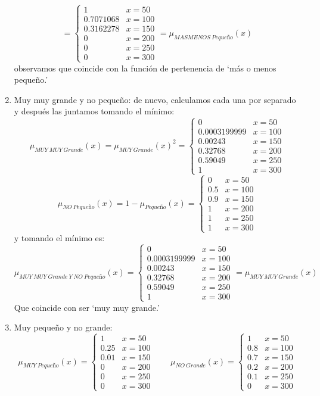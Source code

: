 \documentclass[
]{article}
\begin{document}
\begin{enumerate}
  \[=\begin{cases}
  1 & x=50\\
  0.7071068 & x=100\\
  0.3162278 & x=150\\
  0 & x=200\\
  0 & x=250\\
  0 & x=300
  \end{cases}=\mu_{MASMENOS\ Pequeño}\left(x\right)\] observamos que
  coincide con la función de pertenencia de `más o menos pequeño.'
\item
  Muy muy grande y no pequeño: de nuevo, calculamos cada una por
  separado y después las juntamos tomando el mínimo:
  \[\mu_{MUY\ MUY\ Grande}\left(x\right)=\mu_{MUY\ Grande}\left(x\right)^{2}=\begin{cases}
  0 & x=50\\
  0.0003199999 & x=100\\
  0.00243 & x=150\\
  0.32768 & x=200\\
  0.59049 & x=250\\
  1 & x=300
  \end{cases}\]
  \[\mu_{NO\ Pequeño}\left(x\right)=1-\mu_{Pequeño}\left(x\right)=\begin{cases}
  0 & x=50\\
  0.5 & x=100\\
  0.9 & x=150\\
  1 & x=200\\
  1 & x=250\\
  1 & x=300
  \end{cases}\] y tomando el mínimo es:
  \[\mu_{MUY\ MUY\ Grande\ Y\ NO\ Pequeño}\left(x\right)=\begin{cases}
  0 & x=50\\
  0.0003199999 & x=100\\
  0.00243 & x=150\\
  0.32768 & x=200\\
  0.59049 & x=250\\
  1 & x=300
  \end{cases}=\mu_{MUY\ MUY\ Grande}\left(x\right)\] Que coincide con
  ser `muy muy grande.'
\item
  Muy pequeño y no grande:
  \[\mu_{MUY\ Pequeño}\left(x\right)=\begin{cases}
  1 & x=50\\
  0.25 & x=100\\
  0.01 & x=150\\
  0 & x=200\\
  0 & x=250\\
  0 & x=300
  \end{cases} \qquad \mu_{NO\ Grande}\left(x\right)=\begin{cases}
  1 & x=50\\
  0.8 & x=100\\
  0.7 & x=150\\
  0.2 & x=200\\
  0.1 & x=250\\
  0 & x=300
  \end{cases}\]
\end{enumerate}
\end{document}
